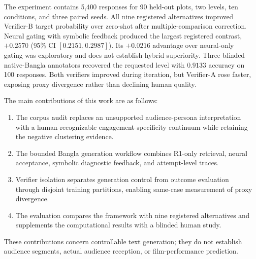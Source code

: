 The experiment contains 5,400 responses for 90 held-out plots, two levels, ten conditions, and three paired seeds. All nine registered alternatives improved Verifier-B target probability over zero-shot after multiple-comparison correction. Neural gating with symbolic feedback produced the largest registered contrast, $+0.2570$ (95\% CI $[0.2151, 0.2987]$). Its $+0.0216$ advantage over neural-only gating was exploratory and does not establish hybrid superiority. Three blinded native-Bangla annotators recovered the requested level with $0.9133$ accuracy on 100 responses. Both verifiers improved during iteration, but Verifier-A rose faster, exposing proxy divergence rather than declining human quality.

The main contributions of this work are as follows:

\begin{enumerate}
    \item The corpus audit replaces an unsupported audience-persona interpretation with a human-recognizable engagement-specificity continuum while retaining the negative clustering evidence.

    \item The bounded Bangla generation workflow combines R1-only retrieval, neural acceptance, symbolic diagnostic feedback, and attempt-level traces.

    \item Verifier isolation separates generation control from outcome evaluation through disjoint training partitions, enabling same-case measurement of proxy divergence.

    \item The evaluation compares the framework with nine registered alternatives and supplements the computational results with a blinded human study.
\end{enumerate}

These contributions concern controllable text generation; they do not establish audience segments, actual audience reception, or film-performance prediction.
